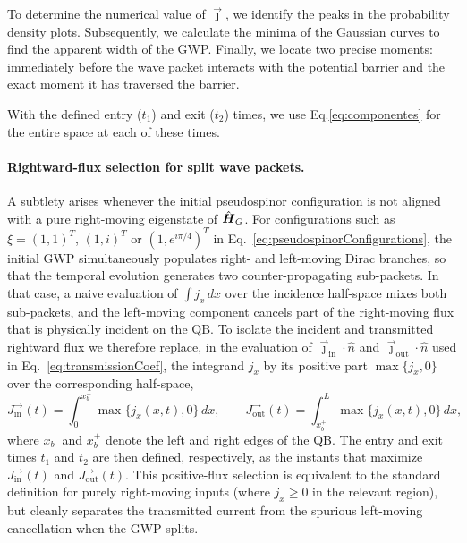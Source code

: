 To determine the numerical value of $\vec{\jmath}$, we identify the peaks in the probability density plots.
Subsequently, we calculate the minima of the Gaussian curves to find the apparent width of the GWP. Finally, we locate two precise moments: immediately before the wave packet interacts with the potential barrier and the exact moment it has traversed the barrier.

With the defined entry ($t_1$) and exit ($t_2$) times, we use Eq.\eqref{eq:componentes} for the entire space at each of these times.

\paragraph{Rightward-flux selection for split wave packets.}
A subtlety arises whenever the initial pseudospinor configuration is not aligned with a pure right-moving eigenstate of $\hat{\mbox{\boldmath $H$}}_G$. For configurations such as $\xi=(1,1)^{T}$, $(1,i)^{T}$ or $(1,e^{i\pi/4})^{T}$ in Eq.~\eqref{eq:pseudospinorConfigurations}, the initial GWP simultaneously populates right- and left-moving Dirac branches, so that the temporal evolution generates two counter-propagating sub-packets. In that case, a naive evaluation of $\int j_x\,dx$ over the incidence half-space mixes both sub-packets, and the left-moving component cancels part of the right-moving flux that is physically incident on the QB. To isolate the incident and transmitted rightward flux we therefore replace, in the evaluation of $\vec{\jmath}_{\mathrm{in}}\cdot\hat{n}$ and $\vec{\jmath}_{\mathrm{out}}\cdot\hat{n}$ used in Eq.~\eqref{eq:transmissionCoef}, the integrand $j_x$ by its positive part $\max\{j_x,0\}$ over the corresponding half-space,
\begin{equation}
    \label{eq:rightwardFlux}
    J^{\rightarrow}_{\mathrm{in}}(t)=\int_{0}^{x_{b}^{-}}\max\{j_x(x,t),0\}\,dx,
    \qquad
    J^{\rightarrow}_{\mathrm{out}}(t)=\int_{x_{b}^{+}}^{L}\max\{j_x(x,t),0\}\,dx,
\end{equation}
\noindent where $x_{b}^{-}$ and $x_{b}^{+}$ denote the left and right edges of the QB. The entry and exit times $t_{1}$ and $t_{2}$ are then defined, respectively, as the instants that maximize $J^{\rightarrow}_{\mathrm{in}}(t)$ and $J^{\rightarrow}_{\mathrm{out}}(t)$. This positive-flux selection is equivalent to the standard definition for purely right-moving inputs (where $j_x\ge 0$ in the relevant region), but cleanly separates the transmitted current from the spurious left-moving cancellation when the GWP splits.

